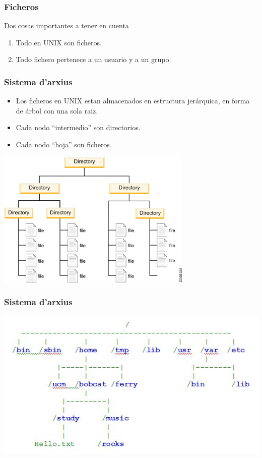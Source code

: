 \documentclass[colorlinks,10pt]{beamer}
\begin{document}
\begin{frame}
  \frametitle{Ficheros}
  \begin{block}{Dos cosas importantes a tener en cuenta}
    \begin{enumerate}
    \item<+->  Todo en UNIX son ficheros.
    \item<+->  Todo fichero pertenece a un usuario y a un grupo. 
    \end{enumerate}
  \end{block}
\end{frame}


\begin{frame}
  \frametitle{Sistema d'arxius}
  \begin{itemize}
  \item Los ficheros en UNIX estan almacenados en estructura
    jerárquica, en forma de árbol con una sola raiz. 
  \item Cada nodo ``intermedio'' son directorios.
  \item Cada nodo ``hoja'' son ficheros.
  \end{itemize}
  
  \begin{center}
    \includegraphics[width=0.7\textwidth]{figs/filesystema} 
  \end{center} 
\end{frame}




\begin{frame}
  \frametitle{Sistema d'arxius}
      \begin{center}
        \includegraphics[width=1\textwidth]{figs/filesystemb} 
      \end{center} 
\end{frame}
\end{document}
